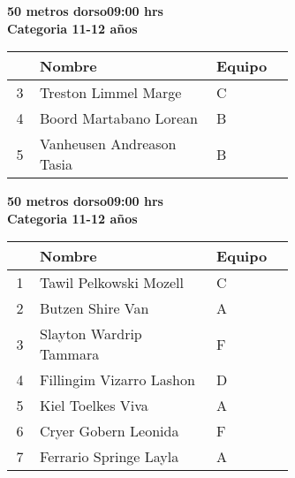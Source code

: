 \begin{minipage}{0.95\linewidth}\vspace{0.5cm} 
\begin{flushleft}
\textbf{
\hspace{-0.15cm}50 metros dorso\hspace{1.5cm}09:00 hrs \\Categoria 11-12 años}\vspace{-0.2cm} 
\end{flushleft}
\begin{tabular}{cp{0.63\linewidth}l}
\hline
& \textbf{Nombre} & \textbf{Equipo} \\ \hline
3 & Treston Limmel Marge & C \\ 
4 & Boord Martabano Lorean & B \\ 
5 & Vanheusen Andreason Tasia & B \\ 
\end{tabular}
\end{minipage}
\begin{minipage}{0.95\linewidth}\vspace{0.5cm} 
\begin{flushleft}
\textbf{
\hspace{-0.15cm}50 metros dorso\hspace{1.5cm}09:00 hrs \\Categoria 11-12 años}\vspace{-0.2cm} 
\end{flushleft}
\begin{tabular}{cp{0.63\linewidth}l}
\hline
& \textbf{Nombre} & \textbf{Equipo} \\ \hline
1 & Tawil Pelkowski Mozell & C \\ 
2 & Butzen Shire Van & A \\ 
3 & Slayton Wardrip Tammara & F \\ 
4 & Fillingim Vizarro Lashon & D \\ 
5 & Kiel Toelkes Viva & A \\ 
6 & Cryer Gobern Leonida & F \\ 
7 & Ferrario Springe Layla & A \\ 
\end{tabular}
\end{minipage}

